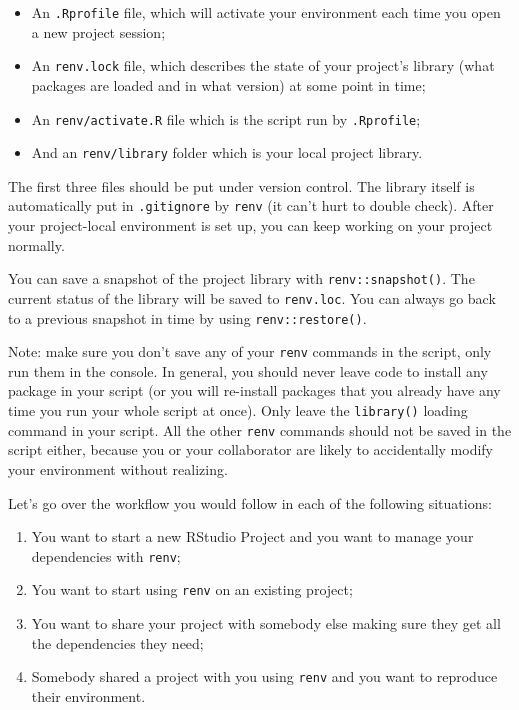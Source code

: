 \documentclass[
]{book}
\providecommand{\tightlist}{%
  \setlength{\itemsep}{0pt}\setlength{\parskip}{0pt}}
\begin{document}
\begin{itemize}
\tightlist
\item
  An \texttt{.Rprofile} file, which will activate your environment each time you
  open a new project session;
\item
  An \texttt{renv.lock} file, which describes the state of your project's library (what packages are loaded and in what version) at some point in time;
\item
  An \texttt{renv/activate.R} file which is the script run by \texttt{.Rprofile};
\item
  And an \texttt{renv/library} folder which is your local project library.
\end{itemize}

The first three files should be put under version control. The library itself is
automatically put in \texttt{.gitignore} by \texttt{renv} (it can't hurt to double check).
After your project-local environment is set up, you can keep working on your
project normally.

You can save a snapshot of the project library with \texttt{renv::snapshot()}. The
current status of the library will be saved to \texttt{renv.loc}. You can always go
back to a previous snapshot in time by using \texttt{renv::restore()}.

Note: make sure you don't save any of your \texttt{renv} commands in the script, only
run them in the console. In general, you should never leave code to install
any package in your script (or you will re-install packages that you already
have any time you run your whole script at once). Only leave the \texttt{library()}
loading command in your script. All the other \texttt{renv} commands should not be
saved in the script either, because you or your collaborator are likely to
accidentally modify your environment without realizing.

Let's go over the workflow you would follow in each of the following situations:

\begin{enumerate}
\def\labelenumi{\arabic{enumi}.}
\tightlist
\item
  You want to start a new RStudio Project and you want to manage your
  dependencies with \texttt{renv};
\item
  You want to start using \texttt{renv} on an existing project;
\item
  You want to share your project with somebody else making sure they get all the
  dependencies they need;
\item
  Somebody shared a project with you using \texttt{renv} and you want to reproduce
  their environment.
\end{enumerate}
\end{document}
